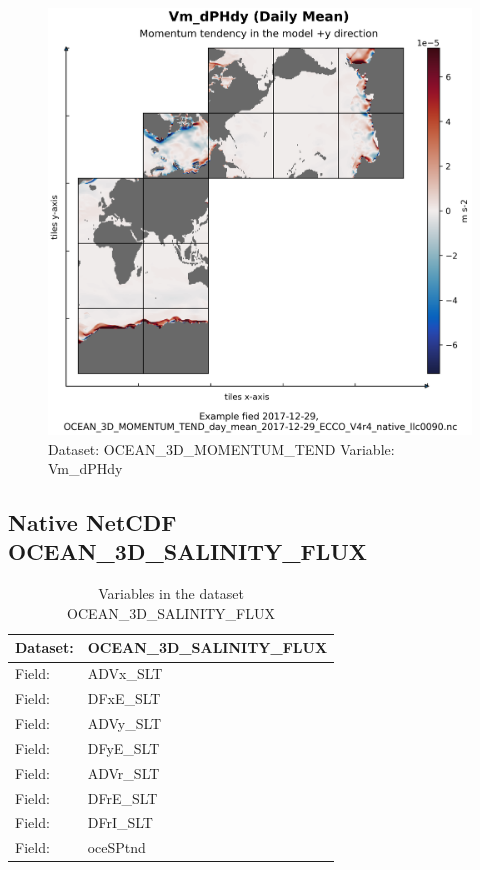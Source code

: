 \begin{figure}[H]
\centering
\includegraphics[scale=0.55]{../images/plots/native_plots/Ocean_Three-Dimensional_Momentum_Tendency/Vm_dPHdy.png}
\caption{Dataset: OCEAN\_3D\_MOMENTUM\_TEND Variable: Vm\_dPHdy}
\label{tab:table-OCEAN_3D_MOMENTUM_TEND_Vm_dPHdy-Plot}
\end{figure}
\pagebreak
\subsection{Native NetCDF OCEAN\_3D\_SALINITY\_FLUX}
\newp
\begin{longtable}{|p{}|p{}|}
\caption{Variables in the dataset OCEAN\_3D\_SALINITY\_FLUX}
\label{tab:table-OCEAN_3D_SALINITY_FLUX-fields} \\ 
\hline \endhead \hline \endfoot
\rowcolor{lightgray} \textbf{Dataset:} & \textbf{OCEAN\_3D\_SALINITY\_FLUX} \\ \hline
Field: &ADVx\_SLT \\ \hline
Field: &DFxE\_SLT \\ \hline
Field: &ADVy\_SLT \\ \hline
Field: &DFyE\_SLT \\ \hline
Field: &ADVr\_SLT \\ \hline
Field: &DFrE\_SLT \\ \hline
Field: &DFrI\_SLT \\ \hline
Field: &oceSPtnd \\ \hline
\end{longtable}

